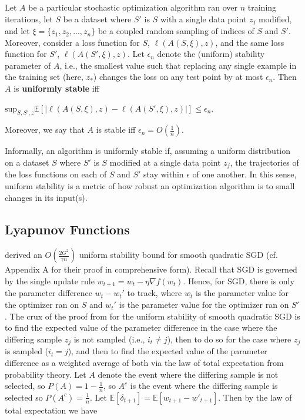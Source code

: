 \documentclass[twoside,11pt]{article}
\begin{document}
\begin{definition}
Let $A$ be a particular stochastic optimization algorithm ran over $n$ training iterations, let $S$ be a dataset where $S'$ is $S$ with a single data point $z_j$ modified, and let $\xi = \{z_1, z_2, ... , z_n\}$ be a coupled random sampling of indices of $S$ and $S'$. Moreover, consider a loss function for $S$, $\ell(A(S, \xi), z)$, and the same loss function for $S'$, $\ell(A(S', \xi), z)$. Let $\epsilon_n$ denote the (uniform) stability parameter of $A$, i.e., the smallest value such that replacing any single example in the training set (here, $z_*$) changes the loss on any test point by at most $\epsilon_n$. Then $A$ is \textbf{uniformly stable} iff

\begin{center}
$\text{sup}_{S,S', z} \mathbb{E}[|\ell(A(S, \xi), z) - \ell(A(S', \xi), z)|] \leq \epsilon_n$.
\end{center}

\noindent
Moreover, we say that $A$ is stable iff $\epsilon_n = O(\frac{1}{n})$.
\end{definition}

\noindent
Informally, an algorithm is uniformly stable if, assuming a uniform distribution on a dataset $S$ where $S'$ is $S$ modified at a single data point $z_j$, the trajectories of the loss functions on each of $S$ and $S'$ stay within $\epsilon$ of one another. In this sense, uniform stability is a metric of how robust an optimization algorithm is to small changes in its input(s).

\subsection{Lyapunov Functions}

\cite{HRS16} derived an $O(\frac{2G^2}{\gamma n})$ uniform stability bound for smooth quadratic SGD (cf. Appendix A for their proof in comprehensive form). Recall that SGD is governed by the single update rule $w_{t+1} = w_t - \eta \nabla f(w_t)$. Hence, for SGD, there is only the parameter difference $w_t - w_t'$ to track, where $w_t$ is the parameter value for the optimizer ran on $S$ and $w_t'$ is the parameter value for the optimizer ran on $S'$. The crux of the proof from \cite{HRS16} for the uniform stability of smooth quadratic SGD is to find the expected value of the parameter difference in the case where the differing sample $z_j$ is not sampled (i.e., $i_t \neq j$), then to do so for the case where $z_j$ is sampled ($i_t = j$), and then to find the expected value of the parameter difference as a weighted average of both via the law of total expectation from probability theory. Let $A$ denote the event where the differing sample is not selected, so $P(A) = 1 - \frac{1}{n}$, so $A^c$ is the event where the differing sample is selected so $P(A^c) = \frac{1}{n}$. Let $\mathbb{E}[\delta_{t+1}] = \mathbb{E}[w_{t+1} - w'_{t+1}]$. Then by the law of total expectation we have
\end{document}

